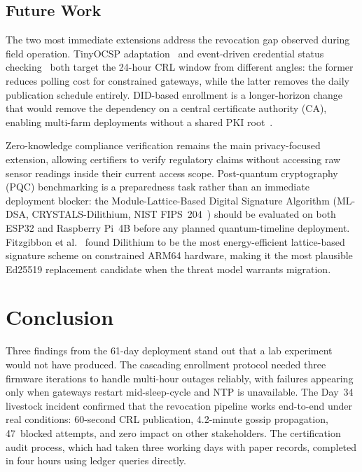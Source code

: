 \documentclass[a4paper,fleqn]{cas-dc}
\begin{document}
\subsection{Future Work}
\label{subsec:future}

The two most immediate extensions address the revocation gap observed
during field operation. TinyOCSP adaptation~\cite{fedrecheski2023tinyocsp}
and event-driven credential status checking~\cite{w3c_vc_status_list}
both target the 24-hour CRL window from different angles: the former
reduces polling cost for constrained gateways, while the latter removes
the daily publication schedule entirely. DID-based enrollment is a
longer-horizon change that would remove the dependency on a central
certificate authority (CA), enabling multi-farm deployments without a
shared PKI root~\cite{w3c_did_core,ferdous2019ssi,tara2023decentralized}.

Zero-knowledge compliance verification remains the main privacy-focused
extension, allowing certifiers to verify regulatory claims without
accessing raw sensor readings inside their current access scope.
Post-quantum cryptography (PQC) benchmarking is a preparedness task
rather than an immediate deployment blocker: the Module-Lattice-Based
Digital Signature Algorithm (ML-DSA, CRYSTALS-Dilithium, NIST
FIPS~204~\cite{crystals_dilithium}) should be evaluated on both ESP32
and Raspberry Pi~4B before any planned quantum-timeline deployment.
Fitzgibbon et al.~\cite{fitzgibbon2024pqc_benchmarks} found Dilithium
to be the most energy-efficient lattice-based signature scheme on
constrained ARM64 hardware, making it the most plausible Ed25519
replacement candidate when the threat model warrants migration.

\section{Conclusion}
\label{sec:conclusion}

Three findings from the 61-day deployment stand out that a lab
experiment would not have produced. The cascading enrollment protocol
needed three firmware iterations to handle multi-hour outages reliably,
with failures appearing only when gateways restart mid-sleep-cycle and
NTP is unavailable. The Day~34 livestock incident confirmed that the
revocation pipeline works end-to-end under real conditions:
60-second CRL publication, 4.2-minute gossip propagation, 47~blocked
attempts, and zero impact on other stakeholders. The certification
audit process, which had taken three working days with paper records,
completed in four hours using ledger queries directly.
\end{document}
